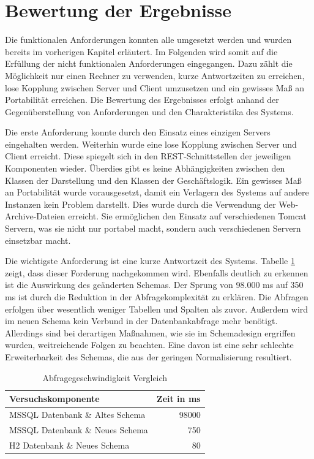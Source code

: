 \section{Bewertung der Ergebnisse}
\label{ch:Ergebnis:sec:bewertung}

Die funktionalen Anforderungen konnten alle umgesetzt werden und wurden bereits im vorherigen Kapitel erläutert. Im Folgenden wird somit auf die Erfüllung der nicht funktionalen Anforderungen eingegangen. Dazu zählt die Möglichkeit nur einen Rechner zu verwenden, kurze Antwortzeiten zu erreichen, lose Kopplung zwischen Server und Client umzusetzen und ein gewisses Maß an Portabilität erreichen. Die Bewertung des Ergebnisses erfolgt anhand der Gegenüberstellung von Anforderungen und den Charakteristika des Systems.

Die erste Anforderung konnte durch den Einsatz eines einzigen Servers eingehalten werden. Weiterhin wurde eine lose Kopplung zwischen Server und Client erreicht. Diese spiegelt sich in den REST-Schnittstellen der jeweiligen Komponenten wieder. Überdies gibt es keine Abhängigkeiten zwischen den Klassen der Darstellung und den Klassen der Geschäftslogik. Ein gewisses Maß an Portabilität wurde vorausgesetzt, damit ein Verlagern des Systems auf andere Instanzen kein Problem darstellt. Dies wurde durch die Verwendung der Web-Archive-Dateien erreicht. Sie ermöglichen den Einsatz auf verschiedenen Tomcat Servern, was sie nicht nur portabel macht, sondern auch verschiedenen Servern einsetzbar macht. 

Die wichtigste Anforderung ist eine kurze Antwortzeit des Systems. Tabelle \ref{tb:vergleichAbfragegeschwindigkeit} zeigt, dass dieser Forderung nachgekommen wird. Ebenfalls deutlich zu erkennen ist die Auswirkung des geänderten Schemas. Der Sprung von 98.000 ms auf 350 ms ist durch die Reduktion in der Abfragekomplexität zu erklären. Die Abfragen erfolgen über wesentlich weniger Tabellen und Spalten als zuvor. Außerdem wird im neuen Schema kein Verbund in der Datenbankabfrage mehr benötigt. Allerdings sind bei derartigen Maßnahmen, wie sie im Schemadesign ergriffen wurden, weitreichende Folgen zu beachten. Eine davon ist eine sehr schlechte Erweiterbarkeit des Schemas, die aus der geringen Normalisierung resultiert.

\begin{table}[htbp]
\centering
\begin{tabular} {l | r}
Versuchskomponente & Zeit in ms  \\ \hline
MSSQL Datenbank \& Altes Schema & 98000 \\
MSSQL Datenbank \& Neues Schema & 750 \\
H2 Datenbank \& Neues Schema & 80 \\
\end{tabular}
\caption{Abfragegeschwindigkeit Vergleich}
\label{tb:vergleichAbfragegeschwindigkeit}
\end{table}

